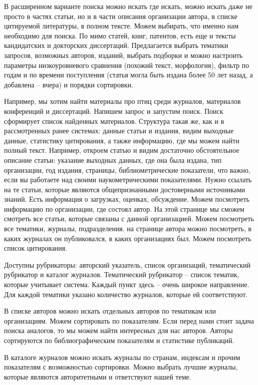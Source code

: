 \documentclass{report}
\begin{document}
В расширенном варианте поиска можно искать где искать, можно искать даже не просто в частях статьи, но и в части описания организации автора, в списке цитируемой литературы, в полном тексте. Можем выбирать, что именно нам необходимо для поиска. По мимо статей, книг, патентов, есть еще и тексты кандидатских и докторских диссертаций. Предлагается выбрать тематики запросов, возможных авторов, изданий, выбрать подборки и можно настроить параметры низкоуровневого сравнения (похожий текст, морфология), фильтр по годам и по времени поступления (статья могла быть издана более 50 лет назад, а добавлена -- вчера) и порядки сортировки. 

Например, мы хотим найти материалы про птиц среди журналов, материалов конференций и диссертаций. Напишем запрос и запустим поиск. Поиск сформирует список найденных материалов. Структура такая же, как и в рассмотренных ранее системах: данные статьи и издания, видим выходные данные, статистику цитирования, а также информацию, где мы можем найти полный текст. Например, откроем статью и видим достаточно обстоятельное описание статьи: указание выходных данных, где она была издана, тип организации, год издания, страницы, библиометрические показатели, что важно, если вы работаете над своими наукометрическими показателями. Нужно ссылать на те статьи, которые являются общепризнанными достоверными источниками знаний. Есть информация о загрузках, оценках, обсуждение. Можем посмотреть информацию по организации, где состоял автор. На этой странице мы сможем смотреть все статьи, которые связаны с данной организацией. Можем посмотреть все тематики, журналы, подразделения. на странице автора можно посмотреть, в каких журналах он публиковался, в каких организациях был. Можем посмотреть список цитирования. 

Доступны рубрикаторы: авторский указатель, список организаций, тематический рубрикатор и каталог журналов. Тематический рубрикатор -- список тематик, которые учитывает система. Каждый пункт здесь -- очень широкое направление. Для каждой тематики указано количество журналов, которые ей соответствуют. 

В списке авторов можно искать отдельных авторов по тематикам или организациям. Можем сортировать по показателям. Если перед нами стоит задача поиска аналогов, то мы можем найти интересных для нас авторов. Авторы сортируются по библиографическим показателям и статистике публикаций. 

В каталоге журналов можно искать журналы по странам, индексам и прочим показателям с возможностью сортировки. Можно выбрать лучшие журналы, которые являются авторитетными и ответствуют нашей теме. 
\end{document}
